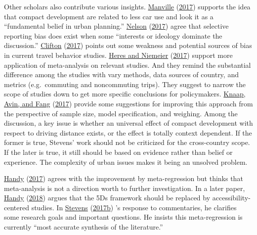 \documentclass[
  11pt,
  openany]{memoir}
\begin{document}
Other scholars also contribute various insights. \protect\hyperlink{ref-manvilleTravelBuiltEnvironment2017}{Manville} (\protect\hyperlink{ref-manvilleTravelBuiltEnvironment2017}{2017}) supports the idea that compact development are related to less car use and look it as a ``fundamental belief in urban planning.'' \protect\hyperlink{ref-nelsonCompactDevelopmentReduces2017}{Nelson} (\protect\hyperlink{ref-nelsonCompactDevelopmentReduces2017}{2017}) agree that selective reporting bias does exist when some ``interests or ideology dominate the discussion.'' \protect\hyperlink{ref-cliftonGettingHereThere2017}{Clifton} (\protect\hyperlink{ref-cliftonGettingHereThere2017}{2017}) points out some weakness and potential sources of bias in current travel behavior studies. \protect\hyperlink{ref-heresFutureResearchLink2017}{Heres and Niemeier} (\protect\hyperlink{ref-heresFutureResearchLink2017}{2017}) support more application of meta-analysis on relevant studies. And they remind the substantial difference among the studies with vary methods, data sources of country, and metrics (e.g.~commuting and noncommuting trips). They suggest to narrow the scope of studies down to get more specific conclusions for policymakers. \protect\hyperlink{ref-knaapDrivingCompactGrowth2017}{Knaap, Avin, and Fang} (\protect\hyperlink{ref-knaapDrivingCompactGrowth2017}{2017}) provide some suggestions for improving this approach from the perspective of sample size, model specification, and weighing. Among the discussion, a key issue is whether an universal effect of compact development with respect to driving distance exists, or the effect is totally context dependent. If the former is true, Stevens' work should not be criticized for the cross-country scope. If the later is true, it still should be based on evidence rather than belief or experience. The complexity of urban issues makes it being an unsolved problem.

\protect\hyperlink{ref-handyThoughtsMeaningMark2017}{Handy} (\protect\hyperlink{ref-handyThoughtsMeaningMark2017}{2017}) agrees with the improvement by meta-regression but thinks that meta-analysis is not a direction worth to further investigation. In a later paper, \protect\hyperlink{ref-handyEnoughAlreadyLet2018}{Handy} (\protect\hyperlink{ref-handyEnoughAlreadyLet2018}{2018}) argues that the 5Ds framework should be replaced by accessibility-centered studies. In \protect\hyperlink{ref-stevensResponseCommentariesDoes2017}{Stevens} (\protect\hyperlink{ref-stevensResponseCommentariesDoes2017}{2017b}) 's response to commentaries, he clarifies some research goals and important questions. He insists this meta-regression is currently ``most accurate synthesis of the literature.''
\end{document}
